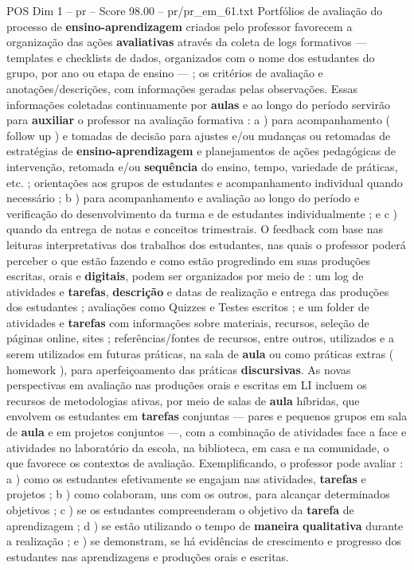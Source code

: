\begin{textsample}{POS Dim 1 – pr – Score 98.00 – pr/pr\_em\_61.txt}
Portfólios de avaliação do processo de \textbf{ensino-aprendizagem} criados pelo professor favorecem a organização das ações \textbf{avaliativas} através da coleta de logs formativos — templates e checklists de dados, organizados com o nome dos estudantes do grupo, por ano ou etapa de ensino — ; os critérios de avaliação e anotações/descrições, com informações geradas pelas observações.
Essas informações coletadas continuamente por \textbf{aulas} e ao longo do período servirão para \textbf{auxiliar} o professor na avaliação formativa : a ) para acompanhamento ( follow up ) e tomadas de decisão para ajustes e/ou mudanças ou retomadas de estratégias de \textbf{ensino-aprendizagem} e planejamentos de ações pedagógicas de intervenção, retomada e/ou \textbf{sequência} do ensino, tempo, variedade de práticas, etc. ; orientações aos grupos de estudantes e acompanhamento individual quando necessário ; b ) para acompanhamento e avaliação ao longo do período e verificação do desenvolvimento da turma e de estudantes individualmente ; e c ) quando da entrega de notas e conceitos trimestrais.
O feedback com base nas leituras interpretativas dos trabalhos dos estudantes, nas quais o professor poderá perceber o que estão fazendo e como estão progredindo em suas produções escritas, orais e \textbf{digitais}, podem ser organizados por meio de : um log de atividades e \textbf{tarefas}, \textbf{descrição} e datas de realização e entrega das produções dos estudantes ; avaliações como Quizzes e Testes escritos ; e um folder de atividades e \textbf{tarefas} com informações sobre materiais, recursos, seleção de páginas online, sites ; referências/fontes de recursos, entre outros, utilizados e a serem utilizados em futuras práticas, na sala de \textbf{aula} ou como práticas extras ( homework ), para aperfeiçoamento das práticas \textbf{discursivas}.
As novas perspectivas em avaliação nas produções orais e escritas em LI incluem os recursos de metodologias ativas, por meio de salas de \textbf{aula} híbridas, que envolvem os estudantes em \textbf{tarefas} conjuntas — pares e pequenos grupos em sala de \textbf{aula} e em projetos conjuntos —, com a combinação de atividades face a face e atividades no laboratório da escola, na biblioteca, em casa e na comunidade, o que favorece os contextos de avaliação.
Exemplificando, o professor pode avaliar : a ) como os estudantes efetivamente se engajam nas atividades, \textbf{tarefas} e projetos ; b ) como colaboram, uns com os outros, para alcançar determinados objetivos ; c ) se os estudantes compreenderam o objetivo da \textbf{tarefa} de aprendizagem ; d ) se estão utilizando o tempo de \textbf{maneira} \textbf{qualitativa} durante a realização ; e ) se demonstram, se há evidências de crescimento e progresso dos estudantes nas aprendizagens e produções orais e escritas.

\end{textsample}
